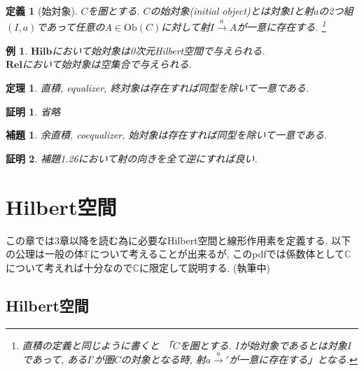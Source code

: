 \documentclass[a4paper,12pt]{ltjsarticle}
\theoremstyle{break}
\newtheorem{defn}[thm]{定義}
\newtheorem{lem}[thm]{補題}
\newtheorem{thrm}[thm]{定理}
\newtheorem{eg}[thm]{例}
\newtheorem*{prf}{証明}
\newcommand{\rel}{\mathbf{Rel}}
\newcommand{\hilb}{\mathbf{Hilb}}
\newcommand{\mbc}{\mathbb{C}}
\newcommand{\Ob}{\mathrm{Ob}}
\newcommand{\xr}[1]{\xrightarrow{#1}}
\numberwithin{equation}{section}
\begin{document}
\begin{defn}[始対象]
  $C$を圏とする. 
  $C$の始対象(initial object)とは対象$I$と射$a$の2つ組$(I,a)$であって任意の$A \in \Ob(C)$に対して射$I \xr{a} A$が一意に存在する.
  \footnote{
  直積の定義と同じように書くと 「$C$を圏とする. 
  $I$が始対象であるとは対象$I$であって, ある$I'$が圏$C$の対象となる時, 射$a \xr a'$が一意に存在する」となる. 
  } 
\end{defn}

\begin{eg}
  $\hilb$において始対象は0次元Hilbert空間で与えられる. \\
  $\rel$において始対象は空集合で与えられる. 
\end{eg}

\begin{thrm}
  直積, equalizer, 終対象は存在すれば同型を除いて一意である. 
\end{thrm}

\begin{prf}
  省略
\end{prf}

\begin{lem}
  余直積, coequalizer, 始対象は存在すれば同型を除いて一意である. 
\end{lem}  

\begin{prf}
  補題1.26において射の向きを全て逆にすれば良い. 
\end{prf}

\newpage

\section{Hilbert空間}

この章では3章以降を読む為に必要なHilbert空間と線形作用素を定義する. 
以下の公理は一般の体$\mathbb{F}$について考えることが出来るが, このpdfでは係数体として$\mbc$について考えれば十分なので$\mbc$に限定して説明する.
(執筆中)

\subsection{Hilbert空間}
\end{document}
